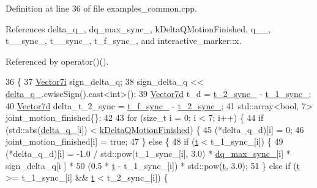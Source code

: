 Definition at line 36 of file examples\+\_\+common.\+cpp.



References delta\+\_\+q\+\_\+, dq\+\_\+max\+\_\+sync\+\_\+, k\+Delta\+Q\+Motion\+Finished, q\+\_\+\_\+, t\+\_\+\_\+sync\+\_\+, t\+\_\+\_\+sync\+\_\+, t\+\_\+f\+\_\+sync\+\_\+, and interactive\+\_\+marker\+::x.



Referenced by operator()().


\begin{DoxyCode}
36                                                                                 \{
37   \hyperlink{classMotionGenerator_ad0a869ececb7689b512dbfbf8f507924}{Vector7i} sign\_delta\_q;
38   sign\_delta\_q << \hyperlink{classMotionGenerator_a943798bdc9c985f66548c59d562fd8b7}{delta\_q\_}.cwiseSign().cast<\textcolor{keywordtype}{int}>();
39   \hyperlink{classMotionGenerator_a499bd17d3a5c7583b4c06923f532185d}{Vector7d} t\_d = \hyperlink{classMotionGenerator_a5b25974dfd22aefacc286a01211ff93d}{t\_2\_sync\_} - \hyperlink{classMotionGenerator_a0b580a9e6904d925146081c870f76266}{t\_1\_sync\_};
40   \hyperlink{classMotionGenerator_a499bd17d3a5c7583b4c06923f532185d}{Vector7d} delta\_t\_2\_sync = \hyperlink{classMotionGenerator_a7119bd48c0d8b0f838a3a81e8f52a8b2}{t\_f\_sync\_} - \hyperlink{classMotionGenerator_a5b25974dfd22aefacc286a01211ff93d}{t\_2\_sync\_};
41   std::array<bool, 7> joint\_motion\_finished\{\};
42 
43   \textcolor{keywordflow}{for} (\textcolor{keywordtype}{size\_t} i = 0; i < 7; i++) \{
44     \textcolor{keywordflow}{if} (std::abs(\hyperlink{classMotionGenerator_a943798bdc9c985f66548c59d562fd8b7}{delta\_q\_}[i]) < \hyperlink{classMotionGenerator_a03e73e0857236b6e3061457bc969efb2}{kDeltaQMotionFinished}) \{
45       (*delta\_q\_d)[i] = 0;
46       joint\_motion\_finished[i] = \textcolor{keyword}{true};
47     \} \textcolor{keywordflow}{else} \{
48       \textcolor{keywordflow}{if} (\hyperlink{namespacebattery__monitor__node_a7a63d20d1ea461e280f4eb5b47f925cd}{t} < t\_1\_sync\_[i]) \{
49         (*delta\_q\_d)[i] = -1.0 / std::pow(t\_1\_sync\_[i], 3.0) * \hyperlink{classMotionGenerator_a4924578b9275d362c015b16f80232263}{dq\_max\_sync\_}[i] * sign\_delta\_q[i
      ] *
50                           (0.5 * \hyperlink{namespacebattery__monitor__node_a7a63d20d1ea461e280f4eb5b47f925cd}{t} - t\_1\_sync\_[i]) * std::pow(\hyperlink{namespacebattery__monitor__node_a7a63d20d1ea461e280f4eb5b47f925cd}{t}, 3.0);
51       \} \textcolor{keywordflow}{else} \textcolor{keywordflow}{if} (\hyperlink{namespacebattery__monitor__node_a7a63d20d1ea461e280f4eb5b47f925cd}{t} >= t\_1\_sync\_[i] && \hyperlink{namespacebattery__monitor__node_a7a63d20d1ea461e280f4eb5b47f925cd}{t} < t\_2\_sync\_[i]) \{

\end{DoxyCode}

